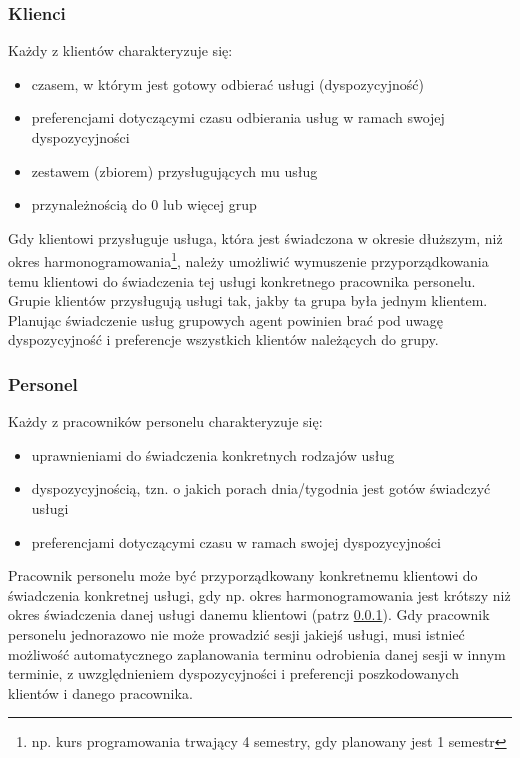 \subsubsection{Klienci}\label{sssec:klienci}
Każdy z klientów charakteryzuje się:
\begin{itemize}
	\item{czasem, w którym jest gotowy odbierać usługi (dyspozycyjność)}
	\item{preferencjami dotyczącymi czasu odbierania usług w ramach swojej dyspozycyjności}
	\item{zestawem (zbiorem) przysługujących mu usług}
	\item{przynależnością do 0 lub więcej grup}
\end{itemize}
Gdy klientowi przysługuje usługa, która jest świadczona w okresie dłuższym, niż okres harmonogramowania\footnote{np. kurs programowania trwający 4 semestry, gdy planowany jest 1 semestr}, należy umożliwić wymuszenie przyporządkowania temu klientowi do świadczenia tej usługi konkretnego pracownika personelu. 
Grupie klientów przysługują usługi tak, jakby ta grupa była jednym klientem. Planując świadczenie usług grupowych agent powinien brać pod uwagę dyspozycyjność i preferencje wszystkich klientów należących do grupy.

\subsubsection{Personel}\label{sssec:personel}
Każdy z pracowników personelu charakteryzuje się:
\begin{itemize}
	\item{uprawnieniami do świadczenia konkretnych rodzajów usług}
	\item{dyspozycyjnością, tzn. o jakich porach dnia/tygodnia jest gotów świadczyć usługi}
	\item{preferencjami dotyczącymi czasu w ramach swojej dyspozycyjności}
\end{itemize}
Pracownik personelu może być przyporządkowany konkretnemu klientowi do świadczenia konkretnej usługi, gdy np. okres harmonogramowania jest krótszy niż okres świadczenia danej usługi danemu klientowi (patrz \ref{sssec:klienci}).
Gdy pracownik personelu jednorazowo nie może prowadzić sesji jakiejś usługi, musi istnieć możliwość automatycznego zaplanowania terminu odrobienia danej sesji w innym terminie, z uwzględnieniem dyspozycyjności i preferencji poszkodowanych klientów i danego pracownika.

